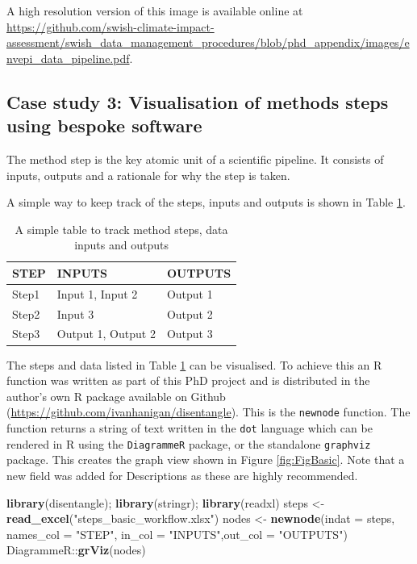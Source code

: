 \documentclass[11pt,a4paper]{article}
\newenvironment{Shaded}{\begin{snugshade}}{\end{snugshade}}
\newcommand{\KeywordTok}[1]{\textcolor[rgb]{0.13,0.29,0.53}{\textbf{{#1}}}}
\newcommand{\DataTypeTok}[1]{\textcolor[rgb]{0.13,0.29,0.53}{{#1}}}
\newcommand{\StringTok}[1]{\textcolor[rgb]{0.31,0.60,0.02}{{#1}}}
\newcommand{\NormalTok}[1]{{#1}}
\begin{document}
A high resolution version of this image is available online at
\url{https://github.com/swish-climate-impact-assessment/swish_data_management_procedures/blob/phd_appendix/images/envepi_data_pipeline.pdf}.

\subsection{Case study 3: Visualisation of methods steps using bespoke
software}\label{case-study-3-visualisation-of-methods-steps-using-bespoke-software}

The method step is the key atomic unit of a scientific pipeline. It
consists of inputs, outputs and a rationale for why the step is taken.

A simple way to keep track of the steps, inputs and outputs is shown in
Table \ref{tab:TableBasic}.

\begin{table}[!h]
\centering
\caption{A simple table to track method steps, data inputs and outputs} 
\label{tab:TableBasic}
\begin{tabular}{p{.6in}p{2in}p{2in}}
  \hline
STEP & INPUTS & OUTPUTS \\ 
  \hline
Step1 & Input 1, Input 2 & Output 1 \\ 
  Step2 & Input 3 & Output 2 \\ 
  Step3 & Output 1, Output 2 & Output 3 \\ 
   \hline
\end{tabular}
\end{table}

The steps and data listed in Table \ref{tab:TableBasic} can be
visualised. To achieve this an R function was written as part of this
PhD project and is distributed in the author's own R package available
on Github (\url{https://github.com/ivanhanigan/disentangle}). This is
the \texttt{newnode} function. The function returns a string of text
written in the \texttt{dot} language which can be rendered in R using
the \texttt{DiagrammeR} package, or the standalone \texttt{graphviz}
package. This creates the graph view shown in Figure \ref{fig:FigBasic}.
Note that a new field was added for Descriptions as these are highly
recommended.

\begin{Shaded}
\begin{Highlighting}[]
\KeywordTok{library}\NormalTok{(disentangle); }\KeywordTok{library}\NormalTok{(stringr); }\KeywordTok{library}\NormalTok{(readxl)}
\NormalTok{steps <-}\StringTok{ }\KeywordTok{read_excel}\NormalTok{(}\StringTok{"steps_basic_workflow.xlsx"}\NormalTok{)}
\NormalTok{nodes <-}\StringTok{ }\KeywordTok{newnode}\NormalTok{(}\DataTypeTok{indat =} \NormalTok{steps, }\DataTypeTok{names_col =} \StringTok{"STEP"}\NormalTok{,}
                 \DataTypeTok{in_col =} \StringTok{"INPUTS"}\NormalTok{,}\DataTypeTok{out_col =} \StringTok{"OUTPUTS"}\NormalTok{)}
\NormalTok{DiagrammeR::}\KeywordTok{grViz}\NormalTok{(nodes)}
\end{Highlighting}
\end{Shaded}
\end{document}
